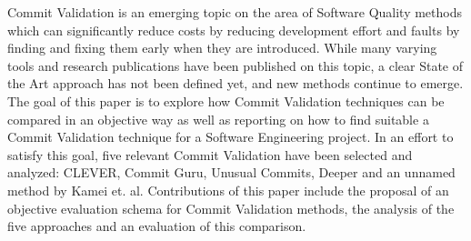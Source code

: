 
Commit Validation is an emerging topic on the area of Software Quality methods which can significantly reduce costs by reducing development effort and faults by finding and fixing them early when they are introduced. While many varying tools and research publications have been published on this topic, a clear State of the Art approach has not been defined yet, and new methods continue to emerge. 
The goal of this paper is to explore how Commit Validation techniques can be compared in an objective way as well as reporting on how to find suitable a Commit Validation technique for a Software Engineering project.
In an effort to satisfy this goal, five relevant Commit Validation have been selected and analyzed: CLEVER, Commit Guru, Unusual Commits, Deeper and an unnamed method by Kamei et. al.
Contributions of this paper include the proposal of an objective evaluation schema for Commit Validation methods, the analysis of the five approaches and an evaluation of this comparison.